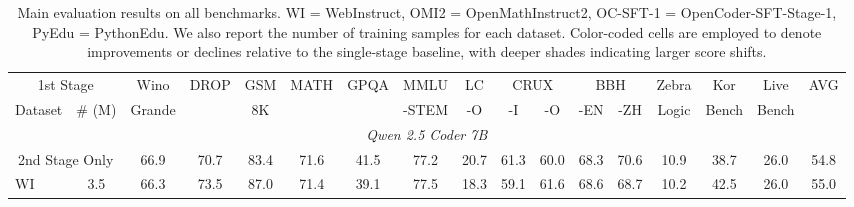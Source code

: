 \begin{table}[!t]
  \centering
  \setlength{\tabcolsep}{2pt}
  \small
  \caption{Main evaluation results on all benchmarks. WI = WebInstruct, OMI2 = OpenMathInstruct2, OC-SFT-1 = OpenCoder-SFT-Stage-1, PyEdu = PythonEdu. We also report the number of training samples for each dataset. Color-coded cells are employed to denote improvements or declines relative to the single-stage baseline, with deeper shades indicating larger score shifts.}
    \begin{tabular}{lc|cccccccccccccc|c}
    \toprule
    \multicolumn{2}{c|}{1st Stage} & Wino  & \multirow{2}[2]{*}{DROP} & GSM   & \multirow{2}[2]{*}{MATH} & \multirow{2}[2]{*}{GPQA} & MMLU  & LC    & \multicolumn{2}{c}{CRUX} & \multicolumn{2}{c}{BBH} & Zebra & Kor   & Live  & \multirow{2}[2]{*}{AVG} \\
    Dataset  & \# (M) & Grande &       & 8K    &       &       & -STEM & -O    & -I    & -O    & -EN   & -ZH   & Logic & Bench & Bench &  \\
    \midrule
    \multicolumn{17}{c}{\textit{Qwen 2.5 Coder 7B}} \\
    \midrule
    \multicolumn{2}{c|}{2nd Stage Only} & 66.9  & 70.7  & 83.4  & 71.6  & 41.5  & 77.2  & 20.7  & 61.3  & 60.0  & 68.3  & 70.6  & 10.9  & 38.7  & 26.0  & \cellcolor[rgb]{ .992,  .996,  .996}54.8 \\
    \midrule
    WI    & 3.5   & \cellcolor[rgb]{ .902,  .486,  .451}66.3 & \cellcolor[rgb]{ .784,  .914,  .851}73.5 & \cellcolor[rgb]{ .541,  .816,  .682}87.0 & \cellcolor[rgb]{ .969,  .851,  .843}71.4 & \cellcolor[rgb]{ .953,  .765,  .749}39.1 & \cellcolor[rgb]{ .863,  .945,  .902}77.5 & \cellcolor[rgb]{ .902,  .486,  .451}18.3 & \cellcolor[rgb]{ .91,  .533,  .502}59.1 & \cellcolor[rgb]{ .867,  .949,  .91}61.6 & \cellcolor[rgb]{ .929,  .973,  .953}68.6 & \cellcolor[rgb]{ .961,  .8,  .784}68.7 & \cellcolor[rgb]{ .914,  .549,  .518}10.2 & \cellcolor[rgb]{ .643,  .859,  .753}42.5 & 26.0  & \cellcolor[rgb]{ .961,  .984,  .973}55.0 \\

\end{tabular}
\end{table}
